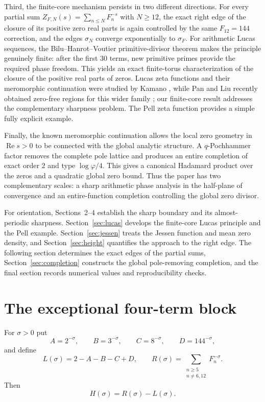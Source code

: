 \documentclass[11pt]{article}
\theoremstyle{remark}
\newcommand{\ZFN}{Z_{F,N}}
\newcommand{\Ree}{\operatorname{Re}}
\begin{document}
Third, the finite-core mechanism persists in two different directions.  For every partial sum $\ZFN(s)=\sum_{n\le N}F_n^{-s}$ with $N\ge12$, the exact right edge of the closure of its positive zero real parts is again controlled by the same $F_{12}=144$ correction, and the edges $\sigma_N$ converge exponentially to $\sigma_F$.  For arithmetic Lucas sequences, the Bilu--Hanrot--Voutier primitive-divisor theorem makes the principle genuinely finite: after the first $30$ terms, new primitive primes provide the required phase freedom.  This yields an exact finite-torus characterization of the closure of the positive real parts of zeros.  Lucas zeta functions and their meromorphic continuation were studied by Kamano \cite{Kamano2013}, while Pan and Liu recently obtained zero-free regions for this wider family \cite{PanLiu2026}; our finite-core result addresses the complementary sharpness problem.  The Pell zeta function provides a simple fully explicit example.

Finally, the known meromorphic continuation allows the local zero geometry in $\Ree s>0$ to be connected with the global analytic structure.  A $q$-Pochhammer factor removes the complete pole lattice and produces an entire completion of exact order $2$ and type $\log\varphi/4$.  This gives a canonical Hadamard product over the zeros and a quadratic global zero bound.  Thus the paper has two complementary scales: a sharp arithmetic phase analysis in the half-plane of convergence and an entire-function completion controlling the global zero divisor.

For orientation, Sections~2--4 establish the sharp boundary and its almost-periodic sharpness.  Section~\ref{sec:lucas} develops the finite-core Lucas principle and the Pell example.  Section~\ref{sec:jessen} treats the Jessen function and mean zero density, and Section~\ref{sec:height} quantifies the approach to the right edge.  The following section determines the exact edges of the partial sums, Section~\ref{sec:completion} constructs the global pole-removing completion, and the final section records numerical values and reproducibility checks.

\section{The exceptional four-term block}

For $\sigma>0$ put
\[
A=2^{-\sigma},\qquad B=3^{-\sigma},\qquad C=8^{-\sigma},\qquad D=144^{-\sigma},
\]
and define
\begin{equation}\label{eq:L-R}
L(\sigma)=2-A-B-C+D,
\qquad
R(\sigma)=\sum_{\substack{n\ge5\\ n\neq6,12}}F_n^{-\sigma}.
\end{equation}
Then
\begin{equation}\label{eq:H-RL}
H(\sigma)=R(\sigma)-L(\sigma).
\end{equation}
\end{document}
